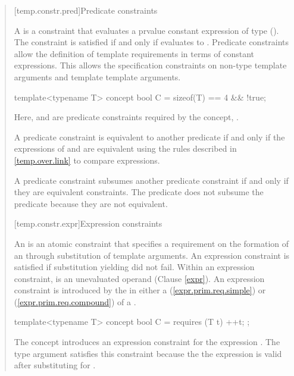 \begin{quote}
[temp.constr.pred]{Predicate constraints}

\pnum
A  is a constraint that evaluates a prvalue 
constant expression  of type  ().
% 
The constraint is satisfied if and only if  evaluates to 
.
% 
\enternote
Predicate constraints allow the definition of template requirements
in terms of constant expressions. This allows the specification 
constraints on non-type template arguments and template template 
arguments.
\exitnote
% 
\enterexample
\begin{codeblock}
template<typename T> concept bool C = sizeof(T) == 4 && !true;
\end{codeblock}
Here,  and  are 
predicate constraints required by the concept, .
\exitexample

\pnum
A predicate constraint  is equivalent to another predicate
 if and only if the expressions of  and 
are equivalent using the rules described in \ref{temp.over.link} to compare
expressions.

\pnum
A predicate constraint  subsumes another predicate constraint 
 if and only if they are equivalent constraints.
% 
\enterexample
The predicate  does not subsume the predicate
 because they are not equivalent.
\exitexample



[temp.constr.expr]{Expression constraints}

\pnum
An  is an atomic constraint
that specifies a requirement on the formation of an
 
through substitution of template arguments.
% 
An expression constraint is satisfied if substitution 
yielding  did not fail. 
% 
Within an expression constraint,  is an unevaluated 
operand (Clause \ref{expr}).
% 
\enternote
An expression constraint is introduced by the  in 
either a  (\ref{expr.prim.req.simple})
or  (\ref{expr.prim.req.compound})
of a .
\exitnote
% 
\enterexample
\begin{codeblock}
template<typename T> concept bool C = requires (T t) { ++t; };
\end{codeblock}
The concept  introduces an expression constraint for 
the expression .
% 
The type argument  satisfies this constraint because the
the expression  is valid after substituting 
for .
\exitexample


\end{quote}
